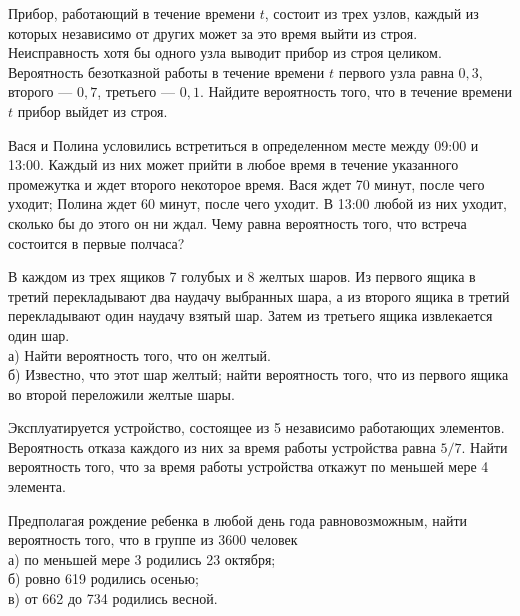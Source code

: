 \newpage\setcounter{zad}{0}



\begin{zkrW}{20}\noindent 
	Прибор, работающий в течение времени $t$, состоит из трех узлов, каждый из которых независимо от других может за это время выйти из строя. Неисправность хотя бы одного узла выводит прибор из строя целиком. Вероятность безотказной работы в течение времени $t$ первого узла равна $0{,}3$, второго --- $0{,}7$, третьего --- $0{,}1$. Найдите вероятность того, что в течение времени $t$ прибор выйдет из строя.
 
\end{zkrW}

\begin{zkrW}{20}\noindent 
	Вася и Полина условились встретиться в определенном месте между 09:00 и 13:00. Каждый из них может прийти в любое время в течение указанного промежутка и ждет второго некоторое время. Вася ждет 70 минут, после чего уходит; Полина ждет 60 минут, после чего уходит. В 13:00 любой из них уходит, сколько бы до этого он ни ждал. Чему равна вероятность того, что встреча состоится в первые полчаса?
 
\end{zkrW}

\begin{zkrW}{20}\noindent 
	В каждом из трех ящиков 7 голубых и 8 желтых шаров. Из первого ящика в третий перекладывают два наудачу выбранных шара, а из второго ящика в третий перекладывают один наудачу взятый шар. Затем из третьего ящика извлекается один шар. \\ \indent а) Найти вероятность того, что он желтый. \\ \indent б) Известно, что этот шар желтый; найти вероятность того, что из первого ящика во второй переложили желтые шары.
 
\end{zkrW}

\begin{zkrW}{20}\noindent 
	Эксплуатируется устройство, состоящее из 5 независимо работающих элементов. Вероятность отказа каждого из них за время работы устройства равна $5/7$. Найти вероятность того, что за время работы устройства откажут по меньшей мере 4 элемента.
 
\end{zkrW}

\begin{zkrW}{20}\noindent 
	Предполагая рождение ребенка в любой день года равновозможным, найти вероятность того, что в группе из 3600 человек \\ \indent а) по меньшей мере 3 родились 23 октября; \\ \indent б) ровно 619 родились осенью; \\ \indent в) от 662 до 734 родились весной.
 
\end{zkrW}

